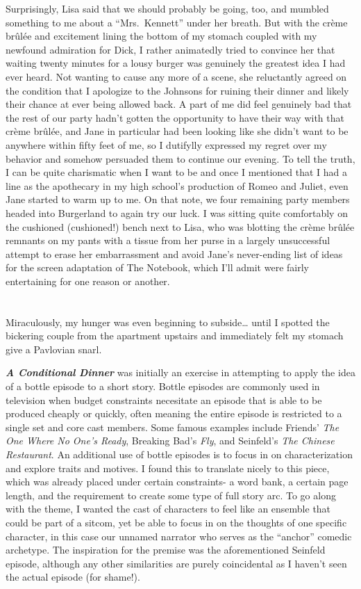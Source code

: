 \documentclass[]{book}
\begin{document}
Surprisingly, Lisa said that we should probably be going, too, and
mumbled something to me about a ``Mrs.~Kennett'' under her breath. But
with the crème brûlée and excitement lining the bottom of my stomach
coupled with my newfound admiration for Dick, I rather animatedly tried
to convince her that waiting twenty minutes for a lousy burger was
genuinely the greatest idea I had ever heard. Not wanting to cause any
more of a scene, she reluctantly agreed on the condition that I
apologize to the Johnsons for ruining their dinner and likely their
chance at ever being allowed back. A part of me did feel genuinely bad
that the rest of our party hadn't gotten the opportunity to have their
way with that crème brûlée, and Jane in particular had been looking like
she didn't want to be anywhere within fifty feet of me, so I dutifylly
expressed my regret over my behavior and somehow persuaded them to
continue our evening. To tell the truth, I can be quite charismatic when
I want to be and once I mentioned that I had a line as the apothecary in
my high school's production of Romeo and Juliet, even Jane started to
warm up to me. On that note, we four remaining party members headed into
Burgerland to again try our luck. I was sitting quite comfortably on the
cushioned (cushioned!) bench next to Lisa, who was blotting the crème
brûlée remnants on my pants with a tissue from her purse in a largely
unsuccessful attempt to erase her embarrassment and avoid Jane's
never-ending list of ideas for the screen adaptation of The Notebook,
which I'll admit were fairly entertaining for one reason or another.

\chapter{}\label{section-10}

Miraculously, my hunger was even beginning to subside\ldots{} until I
spotted the bickering couple from the apartment upstairs and immediately
felt my stomach give a Pavlovian snarl.

\textbf{\emph{A Conditional Dinner}} was initially an exercise in
attempting to apply the idea of a bottle episode to a short story.
Bottle episodes are commonly used in television when budget constraints
necesitate an episode that is able to be produced cheaply or quickly,
often meaning the entire episode is restricted to a single set and core
cast members. Some famous examples include Friends' \emph{The One Where
No One's Ready}, Breaking Bad's \emph{Fly}, and Seinfeld's \emph{The
Chinese Restaurant}. An additional use of bottle episodes is to focus in
on characterization and explore traits and motives. I found this to
translate nicely to this piece, which was already placed under certain
constraints- a word bank, a certain page length, and the requirement to
create some type of full story arc. To go along with the theme, I wanted
the cast of characters to feel like an ensemble that could be part of a
sitcom, yet be able to focus in on the thoughts of one specific
character, in this case our unnamed narrator who serves as the
``anchor'' comedic archetype. The inspiration for the premise was the
aforementioned Seinfeld episode, although any other similarities are
purely coincidental as I haven't seen the actual episode (for shame!).
\end{document}
